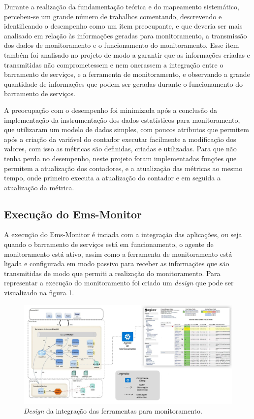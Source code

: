 Durante a realização da fundamentação teórica e do mapeamento sistemático, percebeu-se um grande número de trabalhos comentando, descrevendo e identificando o desempenho como um item preocupante, e que deveria ser mais analisado em relação às informações geradas para monitoramento, a transmissão dos dados de monitoramento e o funcionamento do monitoramento.  Esse item também foi analisado no projeto de modo a garantir que as informações criadas e transmitidas não comprometessem e nem onerassem a integração entre o barramento de serviços, e a ferramenta de monitoramento, e observando a grande quantidade de informações que podem ser geradas durante o funcionamento do barramento de serviços. 

A preocupação com o desempenho foi minimizada após a conclusão da implementação da instrumentação dos dados estatísticos para monitoramento, que utilizaram um modelo de dados simples, com poucos atributos que permitem após a criação da variável do contador executar facilmente a modificação dos valores, com isso as métricas são definidas,  criadas e utilizadas. Para que não tenha perda no desempenho, neste projeto foram implementadas funções que permitem a atualização dos contadores, e a atualização das métricas ao mesmo tempo, onde primeiro executa a atualização do contador e em seguida a atualização da métrica.      


\subsection{Execução do Ems-Monitor}

A execução do Ems-Monitor é inciada com a integração das aplicações, ou seja quando o barramento de serviços está em funcionamento, o agente de monitoramento está ativo, assim como a ferramenta de monitoramento está ligada e configurada em modo passivo para receber as informações que são transmitidas de modo que permiti a realização do monitoramento. Para representar a execução do monitoramento foi criado um \textit{design} que pode ser visualizado na figura \ref{fun:fig:arqtProjeto}. 

\begin{figure}[H]
	\begin{center}
	\includegraphics[scale = 0.45]{img/arqtProjeto.jpeg}
	\caption{\textit{Design} da integração das ferramentas para monitoramento.}
	\label{fun:fig:arqtProjeto}
	\end{center}
\end{figure}


